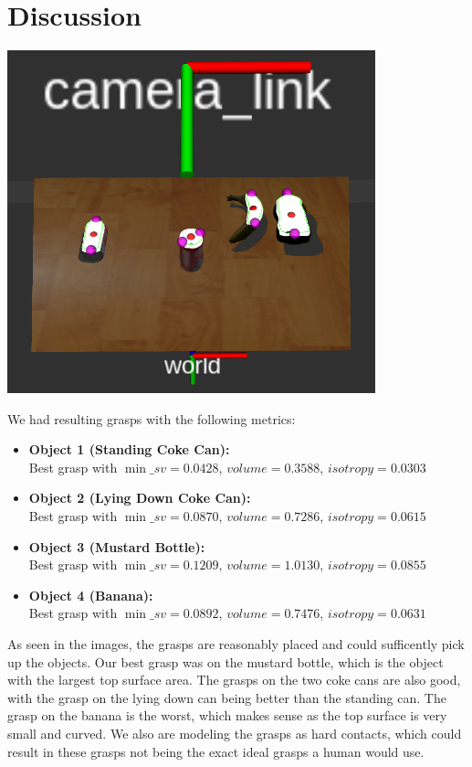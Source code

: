 \documentclass[12pt]{article}
\begin{document}
\section*{Discussion}

\begin{center}
	\includegraphics[width=0.8\textwidth]{final_grasps.png}
\end{center}

We had resulting grasps with the following metrics:

\begin{itemize}
	\item \textbf{Object 1 (Standing Coke Can):} \\
	Best grasp with $\min\_sv=0.0428$, $volume=0.3588$, $isotropy=0.0303$
	\item \textbf{Object 2 (Lying Down Coke Can):} \\
	Best grasp with $\min\_sv=0.0870$, $volume=0.7286$, $isotropy=0.0615$
	\item \textbf{Object 3 (Mustard Bottle):} \\
	Best grasp with $\min\_sv=0.1209$, $volume=1.0130$, $isotropy=0.0855$
	\item \textbf{Object 4 (Banana):} \\
	Best grasp with $\min\_sv=0.0892$, $volume=0.7476$, $isotropy=0.0631$
\end{itemize}

As seen in the images, the grasps are reasonably placed and could sufficently pick up the objects. Our best grasp was on the mustard bottle, which is the object with the largest top surface area. The grasps on the two coke cans are also good, with the grasp on the lying down can being better than the standing can. The grasp on the banana is the worst, which makes sense as the top surface is very small and curved. We also are modeling the grasps as hard contacts, which could result in these grasps not being the exact ideal grasps a human would use. 
\end{document}
